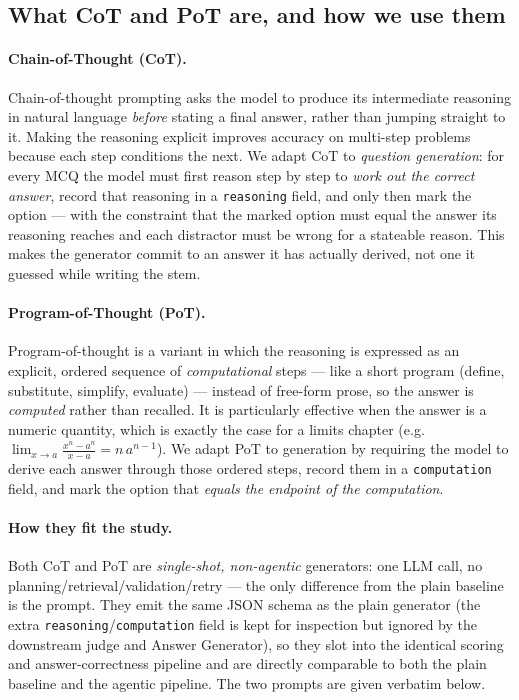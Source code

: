 \subsection{What CoT and PoT are, and how we use them}
\label{sec:bulk-cotpot}

\paragraph{Chain-of-Thought (CoT).} Chain-of-thought prompting asks the model to
produce its intermediate reasoning in natural language \emph{before} stating a
final answer, rather than jumping straight to it. Making the reasoning explicit
improves accuracy on multi-step problems because each step conditions the next. We
adapt CoT to \emph{question generation}: for every MCQ the model must first reason
step by step to \emph{work out the correct answer}, record that reasoning in a
\texttt{reasoning} field, and only then mark the option --- with the constraint
that the marked option must equal the answer its reasoning reaches and each
distractor must be wrong for a stateable reason. This makes the generator commit to
an answer it has actually derived, not one it guessed while writing the stem.

\paragraph{Program-of-Thought (PoT).} Program-of-thought is a variant in which the
reasoning is expressed as an explicit, ordered sequence of \emph{computational}
steps --- like a short program (define, substitute, simplify, evaluate) --- instead
of free-form prose, so the answer is \emph{computed} rather than recalled. It is
particularly effective when the answer is a numeric quantity, which is exactly the
case for a limits chapter (e.g.\ $\lim_{x\to a}\frac{x^n-a^n}{x-a}=n\,a^{n-1}$). We
adapt PoT to generation by requiring the model to derive each answer through those
ordered steps, record them in a \texttt{computation} field, and mark the option
that \emph{equals the endpoint of the computation}.

\paragraph{How they fit the study.} Both CoT and PoT are \emph{single-shot,
non-agentic} generators: one LLM call, no planning/retrieval/validation/retry ---
the only difference from the plain baseline is the prompt. They emit the same JSON
schema as the plain generator (the extra \texttt{reasoning}/\texttt{computation}
field is kept for inspection but ignored by the downstream judge and Answer
Generator), so they slot into the identical scoring and answer-correctness pipeline
and are directly comparable to both the plain baseline and the agentic pipeline.
The two prompts are given verbatim below.

